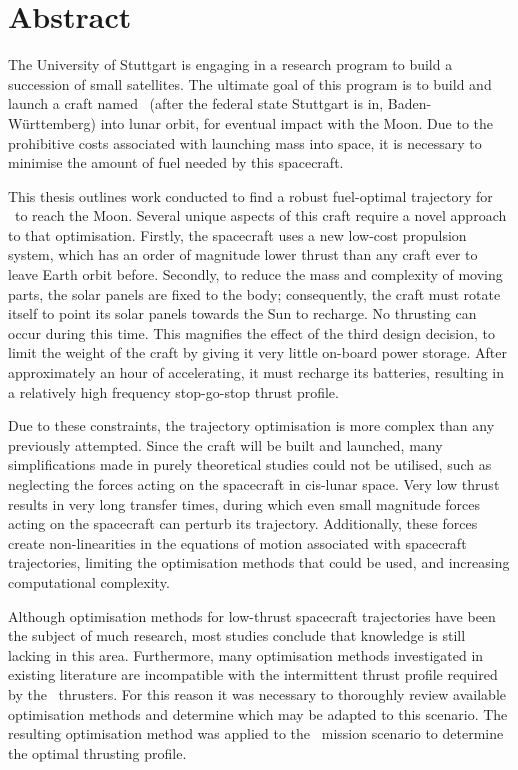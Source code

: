\chapter*{Abstract}

\vfill

The University of Stuttgart is engaging in a research program to build a succession of small satellites. The ultimate goal of this program is to build and launch a craft named \BW\ (after the federal state Stuttgart is in, Baden-W\"{u}rttemberg) into lunar orbit, for eventual impact with the Moon. Due to the prohibitive costs associated with launching mass into space, it is necessary to minimise the amount of fuel needed by this spacecraft.

This thesis outlines work conducted to find a robust fuel-optimal trajectory for \BW\ to reach the Moon. Several unique aspects of this craft require a novel approach to that optimisation. Firstly, the spacecraft uses a new low-cost propulsion system, which has an order of magnitude lower thrust than any craft ever to leave Earth orbit before. Secondly, to reduce the mass and complexity of moving parts, the solar panels are fixed to the body; consequently, the craft must rotate itself to point its solar panels towards the Sun to recharge. No thrusting can occur during this time. This magnifies the effect of the third design decision, to limit the weight of the craft by giving it very little on-board power storage. After approximately an hour of accelerating, it must recharge its batteries, resulting in a relatively high frequency stop-go-stop thrust profile.

Due to these constraints, the trajectory optimisation is more complex than any previously attempted. Since the craft will be built and launched, many simplifications made in purely theoretical studies could not be utilised, such as neglecting the forces acting on the spacecraft in cis-lunar space. Very low thrust results in very long transfer times, during which even small magnitude forces acting on the spacecraft can perturb its trajectory. Additionally, these forces create non-linearities in the equations of motion associated with spacecraft trajectories, limiting the optimisation methods that could be used, and increasing computational complexity.

Although optimisation methods for low-thrust spacecraft trajectories have been the subject of much research, most studies conclude that knowledge is still lacking in this area. Furthermore, many optimisation methods investigated in existing literature are incompatible with the intermittent thrust profile required by the \BW\ thrusters. For this reason it was necessary to thoroughly review available optimisation methods and determine which may be adapted to this scenario. The resulting optimisation method was applied to the \BW\ mission scenario to determine the optimal thrusting profile.

\vfill